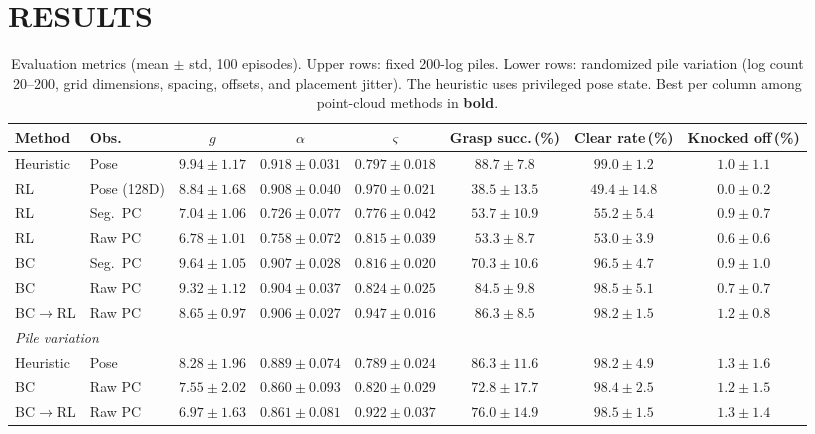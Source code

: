 \documentclass[letterpaper, 10 pt, conference]{ieeeconf}
\begin{document}
\section{RESULTS}
\label{sec:results}
\begin{table}[!t]
\centering
\caption{Evaluation metrics (mean $\pm$ std, 100 episodes). Upper rows: fixed 200-log piles. Lower rows: randomized pile variation (log count 20--200, grid dimensions, spacing, offsets, and placement jitter). The heuristic uses privileged pose state. Best per column among point-cloud methods in \textbf{bold}.}
\label{tab:results}
\setlength{\tabcolsep}{5pt}
\begin{tabular}{@{}llcccccc@{}}
\toprule
Method & Obs. & $g$ & $\alpha$ & $\varsigma$ & Grasp succ.\,(\%) & Clear rate\,(\%) & Knocked off\,(\%) \\
\midrule
Heuristic & Pose & $9.94 \pm 1.17$ & $0.918 \pm 0.031$ & $0.797 \pm 0.018$ & $88.7 \pm 7.8$ & $99.0 \pm 1.2$ & $1.0 \pm 1.1$ \\
\addlinespace
RL & Pose (128D) & $8.84 \pm 1.68$ & $0.908 \pm 0.040$ & $0.970 \pm 0.021$ & $38.5 \pm 13.5$ & $49.4 \pm 14.8$ & $0.0 \pm 0.2$ \\
RL & Seg.\ PC   & $7.04 \pm 1.06$ & $0.726 \pm 0.077$ & $0.776 \pm 0.042$ & $53.7 \pm 10.9$ & $55.2 \pm 5.4$ & $0.9 \pm 0.7$ \\
RL & Raw PC     & $6.78 \pm 1.01$ & $0.758 \pm 0.072$ & $0.815 \pm 0.039$ & $53.3 \pm 8.7$ & $53.0 \pm 3.9$ & $\mathbf{0.6 \pm 0.6}$ \\
\addlinespace
BC & Seg.\ PC   & $\mathbf{9.64 \pm 1.05}$ & $\mathbf{0.907 \pm 0.028}$ & $0.816 \pm 0.020$ & $70.3 \pm 10.6$ & $96.5 \pm 4.7$ & $0.9 \pm 1.0$ \\
BC & Raw PC     & $9.32 \pm 1.12$ & $0.904 \pm 0.037$ & $0.824 \pm 0.025$ & $84.5 \pm 9.8$ & $\mathbf{98.5 \pm 5.1}$ & $0.7 \pm 0.7$ \\
\addlinespace
BC$\to$RL & Raw PC & $8.65 \pm 0.97$ & $0.906 \pm 0.027$ & $\mathbf{0.947 \pm 0.016}$ & $\mathbf{86.3 \pm 8.5}$ & $98.2 \pm 1.5$ & $1.2 \pm 0.8$ \\
\midrule
\multicolumn{8}{l}{\textit{Pile variation}} \\
\midrule
Heuristic & Pose   & $8.28 \pm 1.96$ & $0.889 \pm 0.074$ & $0.789 \pm 0.024$ & $86.3 \pm 11.6$ & $98.2 \pm 4.9$ & $1.3 \pm 1.6$ \\
BC        & Raw PC & $7.55 \pm 2.02$ & $0.860 \pm 0.093$ & $0.820 \pm 0.029$ & $72.8 \pm 17.7$ & $98.4 \pm 2.5$ & $1.2 \pm 1.5$ \\
BC$\to$RL & Raw PC & $6.97 \pm 1.63$ & $0.861 \pm 0.081$ & $0.922 \pm 0.037$ & $76.0 \pm 14.9$ & $98.5 \pm 1.5$ & $1.3 \pm 1.4$ \\
\bottomrule
\end{tabular}
\end{table}
\end{document}

